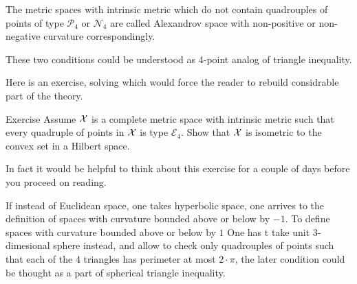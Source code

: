 The metric spaces with intrinsic metric which do not contain quadrouples of points of type $\mathcal{P}_4$ or $\mathcal{N}_4$ 
are called Alexandrov space with non-positive or non-negative curvature correspondingly.

These two conditions could be understood as 4-point analog of triangle inequality.

Here is an exercise, solving which would force the reader to rebuild considrable part of the theory.

\begin{thm}{Exercise}
Assume $\mathcal{X}$ is a complete metric space with intrinsic metric
such that every quadruple of points in $\mathcal{X}$ is type $\mathcal{E}_4$.
Show that $\mathcal{X}$ is isometric to the convex set in a Hilbert space.
\end{thm}

In fact it would be helpful to think about this exercise for a couple of days before you proceed on reading.

If instead of Euclidean space, one takes hyperbolic space,
one arrives to the definition of spaces with curvature bounded above or below by $-1$.
To define spaces with curvature bounded above or below by $1$
One has t take unit 3-dimesional sphere instead,
and allow to check only quadrouples of points such that each of the 4 triangles has perimeter at most $2\cdot\pi$,
the later condition could be thought as a part of spherical triangle inequality.





